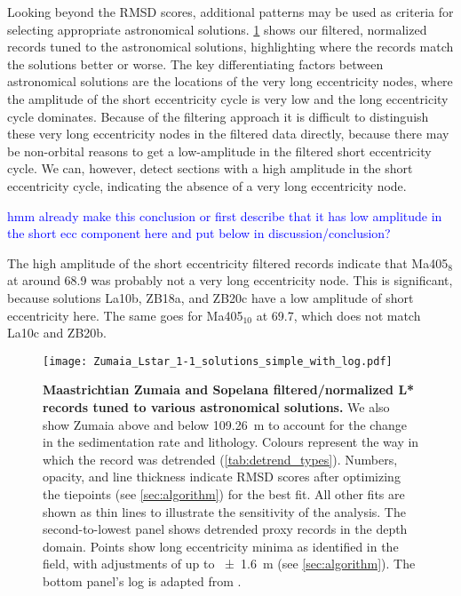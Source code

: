 \documentclass[draft]{agujournal2019}
\newcommand{\ijk}{\textcolor{blue}}
\begin{document}
Looking beyond the \gls{RMSD} scores, additional patterns may be used as criteria for selecting appropriate astronomical solutions.
\cref{fig:rolling-depth-age} shows our filtered, normalized records tuned to the astronomical solutions, highlighting where the records match the solutions better or worse.
The key differentiating factors between astronomical solutions are the locations of the very long eccentricity nodes, where the amplitude of the short eccentricity cycle is very low and the long eccentricity cycle dominates.
Because of the filtering approach it is difficult to distinguish these very long eccentricity nodes in the filtered data directly, because there may be non-orbital reasons to get a low-amplitude in the filtered short eccentricity cycle.
We can, however, detect sections with a high amplitude in the short eccentricity cycle, indicating the absence of a very long eccentricity node.

\ijk{hmm already make this conclusion or first describe that it has low amplitude in the short ecc component here and put below in discussion/conclusion?}

The high amplitude of the short eccentricity filtered records indicate that Ma405\(_{8}\) at around \qty{68.9}{\millionyearago} was probably not a very long eccentricity node.
This is significant, because solutions La10b, ZB18a, and ZB20c have a low amplitude of short eccentricity here.
The same goes for Ma405\(_{10}\) at \qty{69.7}{\millionyearago}, which does not match La10c and ZB20b.

\begin{figure}[htb]
  \centering
  \texttt{[image: Zumaia\_Lstar\_1-1\_solutions\_simple\_with\_log.pdf]}
  \caption{\label{fig:rolling-depth-age}
    \textbf{Maastrichtian Zumaia and Sopelana filtered/normalized \gls{L*} records tuned to various astronomical solutions.}
    We also show Zumaia above and below \qty{109.26}{\metre} to account for the change in the sedimentation rate and lithology.
    Colours represent the way in which the record was detrended (\cref{tab:detrend_types}).
    Numbers, opacity, and line thickness indicate \gls{RMSD} scores after optimizing the tiepoints (see \cref{sec:algorithm}) for the best fit.
    All other fits are shown as thin lines to illustrate the sensitivity of the analysis.
    The second-to-lowest panel shows detrended proxy records in the depth domain.
    Points show long eccentricity minima as identified in the field, with adjustments of up to \qty{\pm1.6}{\metre} (see \cref{sec:algorithm}).
    The bottom panel's log is adapted from .
    }
\end{figure}
\end{document}
